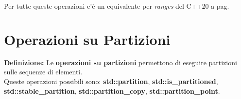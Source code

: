 \fleuron

\textsf{\small Per tutte queste operazioni c'è un equivalente per \emph{ranges} del C++20 a pag. \pageref{ranges}} \\


\section{Operazioni su Partizioni}

\textsf{\small \textbf{Definizione: } Le \textbf{operazioni su partizioni} permettono di eseguire partizioni sulle sequenze di elementi.} \\

\textsf{\small Queste operazioni possibili sono: \textbf{std::partition}, \textbf{std::is\_partitioned}, \textbf{std::stable\_partition}, \textbf{std::partition\_copy}, \textbf{std::partition\_point}.} \\

